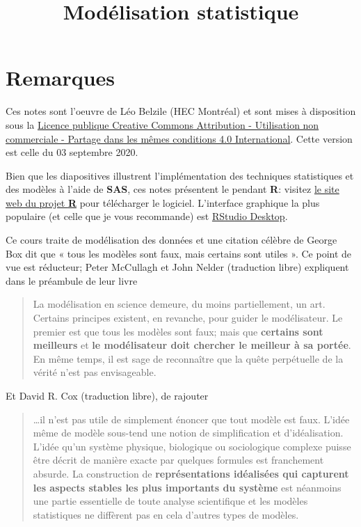 \documentclass[
  11pt,
  letterpaper,
]{article}
\title{Modélisation statistique}
\author{}
\date{\vspace{-2.5em}}
\let\oldhref\href
\renewcommand{\href}[2]{#2\footnote{\url{#1}}}
\theoremstyle{definition}
\theoremstyle{definition}
\theoremstyle{definition}
\theoremstyle{remark}
\begin{document}
\maketitle

\let\href\oldhref

{
\setcounter{tocdepth}{2}
\tableofcontents
}
\hypertarget{remarques}{%
\section*{Remarques}\label{remarques}}

Ces notes sont l'oeuvre de Léo Belzile (HEC Montréal) et sont mises à disposition sous la \href{https://creativecommons.org/licenses/by-nc-sa/4.0/legalcode.fr}{Licence publique Creative Commons Attribution - Utilisation non commerciale - Partage dans les mêmes conditions 4.0 International}. Cette version est celle du 03 septembre 2020.

Bien que les diapositives illustrent l'implémentation des techniques statistiques et des modèles à l'aide de \textbf{SAS}, ces notes présentent le pendant \textbf{R}: visitez \href{https://cran.r-project.org/}{le site web du projet \textbf{R}} pour télécharger le logiciel. L'interface graphique la plus populaire (et celle que je vous recommande) est \href{https://www.rstudio.com/products/rstudio/download/}{RStudio Desktop}.

Ce cours traite de modélisation des données et une citation célèbre de George Box dit que « tous les modèles sont faux, mais certains sont utiles ». Ce point de vue est réducteur; Peter McCullagh et John Nelder (traduction libre) expliquent dans le préambule de leur livre

\begin{quote}
La modélisation en science demeure, du moins partiellement, un art. Certains principes existent, en revanche, pour guider le modélisateur. Le premier est que tous les modèles sont faux; mais que \textbf{certains sont meilleurs} et \textbf{le modélisateur doit chercher le meilleur à sa portée}. En même temps, il est sage de reconnaître que la quête perpétuelle de la vérité n'est pas envisageable.
\end{quote}

Et David R. Cox (traduction libre), de rajouter

\begin{quote}
\ldots il n'est pas utile de simplement énoncer que tout modèle est faux. L'idée même de modèle sous-tend une notion de simplification et d'idéalisation. L'idée qu'un système physique, biologique ou sociologique complexe puisse être décrit de manière exacte par quelques formules est franchement absurde. La construction de \textbf{représentations idéalisées qui capturent les aspects stables les plus importants du système} est néanmoins une partie essentielle de toute analyse scientifique et les modèles statistiques ne diffèrent pas en cela d'autres types de modèles.
\end{quote}
\end{document}
